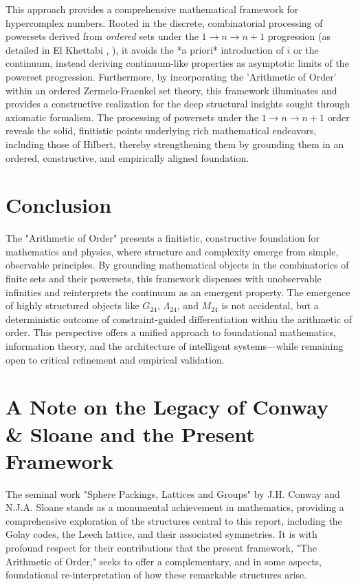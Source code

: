 \documentclass[11pt,a4paper]{article}
\begin{document}
This approach provides a comprehensive mathematical framework for hypercomplex numbers. Rooted in the discrete, combinatorial processing of powersets derived from \textit{ordered} sets under the $1 \to n \to n+1$ progression (as detailed in El Khettabi \cite{ElKhettabi2024HCN}, \cite{ElKhettabi2025AO}), it avoids the *a priori* introduction of $i$ or the continuum, instead deriving continuum-like properties as asymptotic limits of the powerset progression. Furthermore, by incorporating the 'Arithmetic of Order' within an ordered Zermelo-Fraenkel set theory, this framework illuminates and provides a constructive realization for the deep structural insights sought through axiomatic formalism. The processing of powersets under the $1 \to n \to n+1$ order reveals the solid, finitistic points underlying rich mathematical endeavors, including those of Hilbert, thereby strengthening them by grounding them in an ordered, constructive, and empirically aligned foundation.

\section{Conclusion}

The "Arithmetic of Order" presents a finitistic, constructive foundation for mathematics and physics, where structure and complexity emerge from simple, observable principles. By grounding mathematical objects in the combinatorics of finite sets and their powersets, this framework dispenses with unobservable infinities and reinterprets the continuum as an emergent property. The emergence of highly structured objects like $G_{24}$, $\Lambda_{24}$, and $M_{24}$ is not accidental, but a deterministic outcome of constraint-guided differentiation within the arithmetic of order. This perspective offers a unified approach to foundational mathematics, information theory, and the architecture of intelligent systems—while remaining open to critical refinement and empirical validation.

\hrulefill

\appendix
\section{A Note on the Legacy of Conway \& Sloane and the Present Framework}
\label{app:conway_sloane}

The seminal work "Sphere Packings, Lattices and Groups" by J.H. Conway and N.J.A. Sloane \cite{ConwaySloane1999} stands as a monumental achievement in mathematics, providing a comprehensive exploration of the structures central to this report, including the Golay codes, the Leech lattice, and their associated symmetries. It is with profound respect for their contributions that the present framework, "The Arithmetic of Order," seeks to offer a complementary, and in some aspects, foundational re-interpretation of how these remarkable structures arise.
\end{document}
